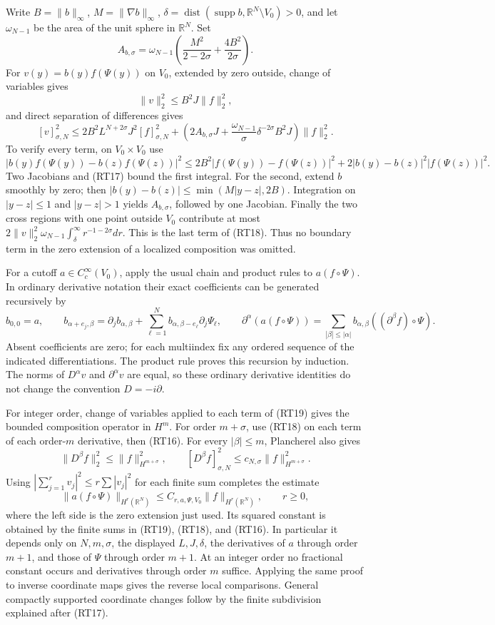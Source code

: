 \documentclass[
  11pt,
]{article}
\begin{document}
Write \(B=\|b\|_\infty\), \(M=\|\nabla b\|_\infty\),
\(\delta=\operatorname{dist}(\operatorname{supp}b,\mathbb R^N\setminus V_0)>0\),
and let \(\omega_{N-1}\) be the area of the unit sphere in
\(\mathbb R^N\). Set \[
 A_{b,\sigma}=\omega_{N-1}
 \left(\frac{M^2}{2-2\sigma}+\frac{4B^2}{2\sigma}\right).
\] For \(v(y)=b(y)f(\Psi(y))\) on \(V_0\), extended by zero outside,
change of variables gives \[
 \|v\|_2^2\leq B^2J\|f\|_2^2,
\] and direct separation of differences gives \[
 [v]_{\sigma,N}^2
 \leq2B^2L^{N+2\sigma}J^2[f]_{\sigma,N}^2
 +\left(2A_{b,\sigma}J+
 \frac{\omega_{N-1}}{\sigma}\delta^{-2\sigma}B^2J\right)\|f\|_2^2.
 \tag{RT18}
\] To verify every term, on \(V_0\times V_0\) use \[
 |b(y)f(\Psi(y))-b(z)f(\Psi(z))|^2
 \leq2B^2|f(\Psi(y))-f(\Psi(z))|^2
      +2|b(y)-b(z)|^2|f(\Psi(z))|^2.
\] Two Jacobians and (RT17) bound the first integral. For the second,
extend \(b\) smoothly by zero; then \(|b(y)-b(z)|\leq\min(M|y-z|,2B)\).
Integration on \(|y-z|\leq1\) and \(|y-z|>1\) yields \(A_{b,\sigma}\),
followed by one Jacobian. Finally the two cross regions with one point
outside \(V_0\) contribute at most
\(2\|v\|_2^2\omega_{N-1}\int_\delta^\infty r^{-1-2\sigma}dr\). This is
the last term of (RT18). Thus no boundary term in the zero extension of
a localized composition was omitted.

For a cutoff \(a\in C_c^\infty(V_0)\), apply the usual chain and product
rules to \(a(f\circ\Psi)\). In ordinary derivative notation their exact
coefficients can be generated recursively by \[
 b_{0,0}=a,\qquad
 b_{\alpha+e_j,\beta}
 =\partial_jb_{\alpha,\beta}
  +\sum_{\ell=1}^N b_{\alpha,\beta-e_\ell}\partial_j\Psi_\ell,
 \qquad
 \partial^\alpha(a(f\circ\Psi))
 =\sum_{|\beta|\leq|\alpha|}b_{\alpha,\beta}
       ((\partial^\beta f)\circ\Psi).
 \tag{RT19}
\] Absent coefficients are zero; for each multiindex fix any ordered
sequence of the indicated differentiations. The product rule proves this
recursion by induction. The norms of \(D^\alpha v\) and
\(\partial^\alpha v\) are equal, so these ordinary derivative identities
do not change the convention \(D=-i\partial\).

For integer order, change of variables applied to each term of (RT19)
gives the bounded composition operator in \(H^m\). For order
\(m+\sigma\), use (RT18) on each term of each order-\(m\) derivative,
then (RT16). For every \(|\beta|\leq m\), Plancherel also gives \[
 \|D^\beta f\|_2^2\leq\|f\|_{H^{m+\sigma}}^2,
 \qquad
 [D^\beta f]_{\sigma,N}^2
 \leq c_{N,\sigma}\|f\|_{H^{m+\sigma}}^2.
\] Using \(|\sum_{j=1}^{r}v_j|^2\leq r\sum|v_j|^2\) for each finite sum
completes the estimate \[
 \|a(f\circ\Psi)\|_{H^r(\mathbb R^N)}
 \leq C_{r,a,\Psi,V_0}\|f\|_{H^r(\mathbb R^N)},\qquad r\geq0,
 \tag{RT20}
\] where the left side is the zero extension just used. Its squared
constant is obtained by the finite sums in (RT19), (RT18), and (RT16).
In particular it depends only on \(N,m,\sigma\), the displayed
\(L,J,\delta\), the derivatives of \(a\) through order \(m+1\), and
those of \(\Psi\) through order \(m+1\). At an integer order no
fractional constant occurs and derivatives through order \(m\) suffice.
Applying the same proof to inverse coordinate maps gives the reverse
local comparisons. General compactly supported coordinate changes follow
by the finite subdivision explained after (RT17).
\end{document}
